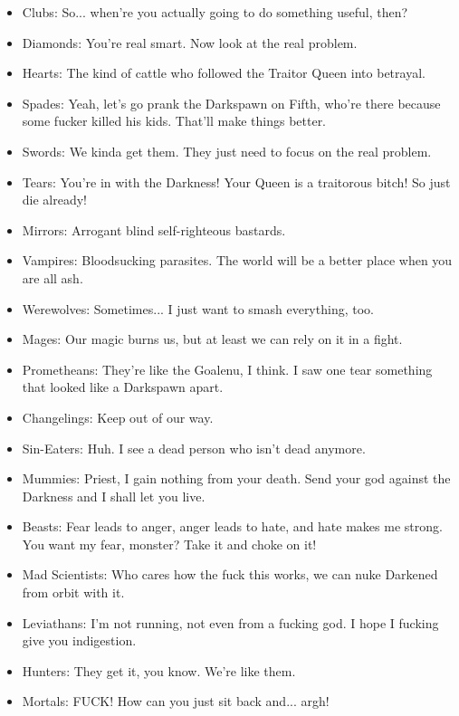 \begin{itemize}
\item Clubs: So... when're you actually going to do something useful, then?
\item Diamonds: You're real smart. Now look at the real problem.
\item Hearts: The kind of cattle who followed the Traitor Queen into betrayal.
\item Spades: Yeah, let's go prank the Darkspawn on Fifth, who're there because some fucker killed his kids. That'll make things better.
\item Swords: We kinda get them. They just need to focus on the real problem.
\item Tears: You're in with the Darkness! Your Queen is a traitorous bitch! So just die already!
\item Mirrors: Arrogant blind self-righteous bastards.

\item Vampires: Bloodsucking parasites. The world will be a better place when you are all ash.
\item Werewolves: Sometimes... I just want to smash everything, too.
\item Mages: Our magic burns us, but at least we can rely on it in a fight. 
\item Prometheans: They're like the Goalenu, I think. I saw one tear something that looked like a Darkspawn apart. 
\item Changelings: Keep out of our way.
\item Sin-Eaters: Huh. I see a dead person who isn't dead anymore.
\item Mummies: Priest, I gain nothing from your death. Send your god against the Darkness and I shall let you live. 
\item Beasts: Fear leads to anger, anger leads to hate, and hate makes me strong. You want my fear, monster? Take it and choke on it!
\item Mad Scientists: Who cares how the fuck this works, we can nuke Darkened from orbit with it.
\item Leviathans: I'm not running, not even from a fucking god. I hope I fucking give you indigestion. 

\item Hunters: They get it, you know. We're like them.
\item Mortals: FUCK! How can you just sit back and... argh! 
\end{itemize}

